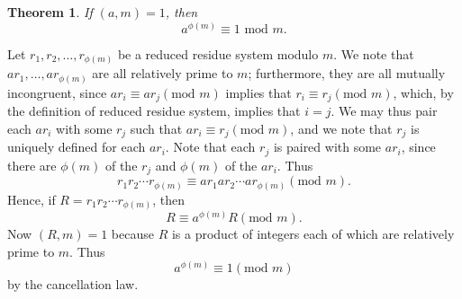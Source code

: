 \documentclass{article}
\makeatletter
\newtheorem{theorem}{Theorem}[section]
\theoremstyle{definition}
\theoremstyle{remark}
\let\oldproofname=\proofname
\renewcommand{\proofname}{\textit{\oldproofname}}
\theoremstyle{definition}
\renewenvironment{proof}[1][\proofname]{\par
  \pushQED{\qed}%
  \normalfont \topsep6\p@\@plus6\p@\relax
  \list{}{\leftmargin=0mm
          \rightmargin=0mm
          \settowidth{\itemindent}{\itshape#1}%
          \labelwidth=\itemindent
          \parsep=0pt \listparindent=0mm%
  }
  \item[\hskip\labelsep
        \itshape
    #1\@addpunct{.}]\ignorespaces
}{%
  \popQED\endlist\@endpefalse
}
\makeatother
\begin{document}
    \begin{theorem}\label{thm:1.2}
        If $(a,m)=1$, then 
            \begin{equation*}
                a^{\phi(m)}\equiv 1\text{ mod }m.
            \end{equation*}
    \end{theorem}
        \begin{proof}
            Let $r_1, r_2, \dots, r_{\phi(m)}$ be a reduced residue system modulo $m$. We note that $ar_1, \dots, ar_{\phi(m)}$ are all relatively prime to $m$; furthermore, they are all mutually incongruent, since $ar_i\equiv ar_j(\text{mod }m)$ implies that $r_i\equiv r_j(\text{mod } m)$, which, by the definition of reduced residue system, implies that $i=j$. We may thus pair each $ar_i$ with some $r_j$ such that $ar_i\equiv r_j(\text{mod }m)$, and we note that $r_j$ is uniquely defined for each $ar_i$. Note that each $r_j$ is paired with some $ar_i$, since there are $\phi(m)$ of the $r_j$ and $\phi(m)$ of the $ar_i$. Thus
                \begin{equation*}
                    r_1r_2\cdots r_{\phi(m)}\equiv ar_1ar_2\cdots ar_{\phi(m)}(\text{mod }m).
                \end{equation*}
            Hence, if $R=r_1r_2\cdots r_{\phi(m)}$, then 
                \begin{equation*}
                    R\equiv a^{\phi(m)}R(\text{mod }m).
                \end{equation*}
            Now $(R,m)=1$ because $R$ is a product of integers each of which are relatively prime to $m$. Thus
                \begin{equation*}
                    a^{\phi(m)}\equiv 1(\text{mod }m)
                \end{equation*}
            by the cancellation law.
        \end{proof}
\end{document}
